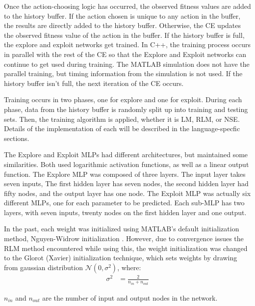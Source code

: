 \par Once the action-choosing logic has occurred, the observed fitness values are added to the history buffer. If the action chosen is unique to any action in the buffer, the results are directly added to the history buffer. Otherwise, the CE updates the observed fitness value of the action in the buffer. If the history buffer is full, the explore and exploit networks get trained. In C++, the training process occurs in parallel with the rest of the CE so that the Explore and Exploit networks can continue to get used during training. The MATLAB simulation does not have the parallel training, but timing information from the simulation is not used. If the history buffer isn't full, the next iteration of the CE occurs.
\par Training occurs in two phases, one for explore and one for exploit. During each phase, data from the history buffer is randomly split up into training and testing sets. Then, the training algorithm is applied, whether it is LM, RLM, or NSE. Details of the implementation of each will be described in the language-specfic sections. 
\par The Explore and Exploit MLPs had different architectures, but maintained some similarities. Both used logarithmic activation functions, as well as a linear output function. The Explore MLP was composed of three layers. The input layer takes seven inputs, The first hidden layer has seven nodes, the second hidden layer had fifty nodes, and the output layer has one node. The Exploit MLP was actually six different MLPs, one for each parameter to be predicted. Each sub-MLP has two layers, with seven  inputs, twenty nodes on the first hidden layer and one output. 
\par In the past, each weight was initialized using MATLAB's default initialization method, Nguyen-Widrow initialization \cite{nguyen_widrow}. However, due to convergence issues the RLM method encountered while using this, the weight initialization was changed to the Glorot (Xavier) initialization technique\cite{glorot_training}, which sets weights by drawing from gaussian distribution $\mathcal{N}(0,\sigma^2)$, where:
\begin{align*}
	\sigma^2 &= \frac{2}{n_{in}+n_{out}}
\end{align*} 
\par $n_{in}$ and $n_{out}$ are the number of input and output nodes in the network.
